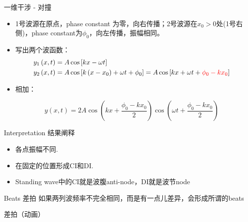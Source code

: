 \documentclass{beamer}
\begin{document}
\begin{frame}{一维干涉 - 对撞}
	\begin{itemize}
		\item 1号波源在原点，phase constant 为零，向右传播；2号波源在$x_0>0$处(1号右侧)，phase constant为$\phi_0$，向左传播，振幅相同。
		\item 写出两个波函数：
		\begin{align*}
			y_1\left(x, t\right) &= A \cos \left[kx - \omega t\right]\\
			y_2\left(x, t\right) &= A \cos \left[k\left(x - x_0\right) + \omega t + \phi_0 \right] = A \cos \left[kx + \omega t + \textcolor{red}{\phi_0 - kx_0}\right]
		\end{align*}
		\item 相加：
		
		\[y\left(x, t\right) = 2A \cos \left(kx + \frac{\phi_0 - kx_0}{2}\right)\cos \left(\omega t + \frac{\phi_0 - kx_0}{2}\right)\]
	\end{itemize}
\end{frame}

\begin{frame}{Interpretation 结果阐释}
	\begin{itemize}
		\item 各点振幅不同.
		\item 在固定的位置形成CI和DI.
		\item Standing wave中的CI就是波腹anti-node，DI就是波节node
	\end{itemize}
\end{frame}

\begin{frame}{Beats 差拍}
	如果两列波频率不完全相同，而是有一点儿差异，会形成所谓的beats
	\begin{block}{差拍（动画）}
	\begin{center}
		\href{run:./LectureNotePics/Beats.gif}{}\\
	\end{center}
	\end{block}
\end{frame}
\end{document}
